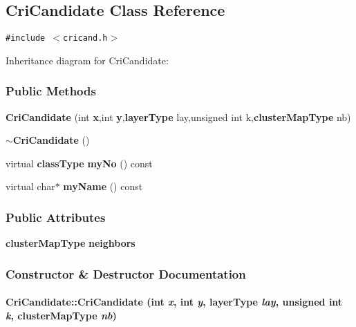 \subsection{Cri\-Candidate  Class Reference}
\label{CriCandidate}
{\tt \#include $<$cricand.h$>$}

Inheritance diagram for Cri\-Candidate:\begin{figure}[H]
\begin{center}
\leavevmode
\setlength{\epsfysize}{4cm}
\end{center}
\end{figure}
\subsubsection*{Public Methods}
\begin{CompactItemize}
\item 
{\bf Cri\-Candidate} (int {\bf x},int {\bf y},{\bf layer\-Type} lay,unsigned int k,{\bf cluster\-Map\-Type} nb)
\item 
{\bf $\sim$Cri\-Candidate} ()
\item 
virtual {\bf class\-Type} {\bf my\-No} () const
\item 
virtual char$\ast$ {\bf my\-Name} () const
\end{CompactItemize}
\subsubsection*{Public Attributes}
\begin{CompactItemize}
\item 
{\bf cluster\-Map\-Type} {\bf neighbors}
\end{CompactItemize}


\subsubsection{Constructor \& Destructor Documentation}
\label{CriCandidate_a0}
\paragraph{\setlength{\rightskip}{0pt plus 5cm}Cri\-Candidate::Cri\-Candidate (int {\em x}, int {\em y}, {\bf layer\-Type} {\em lay}, unsigned int {\em k}, {\bf cluster\-Map\-Type} {\em nb})}\hfill



